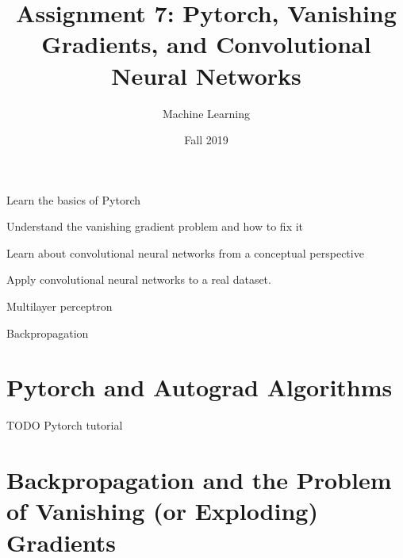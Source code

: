 \documentclass[assignment07_Solutions]{subfiles}
\title{Assignment 7: Pytorch, Vanishing Gradients, and Convolutional Neural Networks}
\author{Machine Learning}
\date{Fall 2019}
\begin{document}
\maketitle
\thispagestyle{firstpage}


\begin{learningobjectives}
\bi
\item Learn the basics of Pytorch
\item Understand the vanishing gradient problem and how to fix it
\item Learn about convolutional neural networks from a conceptual perspective
\item Apply convolutional neural networks to a real dataset.
\ei
\end{learningobjectives}

\begin{priorknowledge}
\bi
\item Multilayer perceptron
\item Backpropagation
\ei
\end{priorknowledge}

\section{Pytorch and Autograd Algorithms}
TODO Pytorch tutorial

\section{Backpropagation and the Problem of Vanishing (or Exploding) Gradients}
\end{document}

